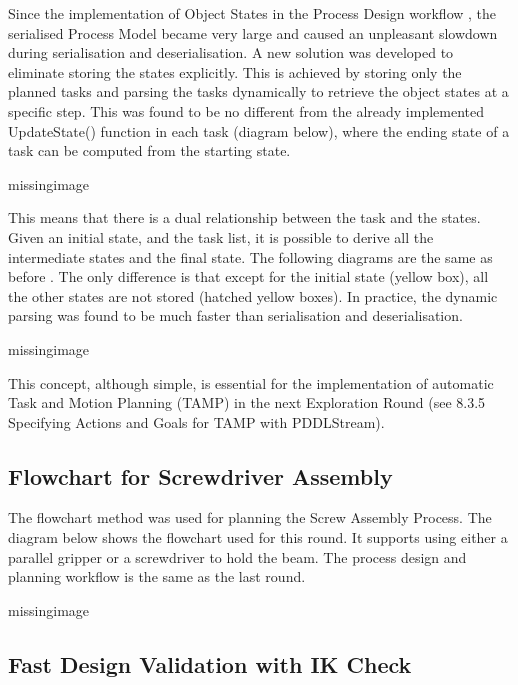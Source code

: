 Since the implementation of Object States in the Process Design workflow , the serialised Process Model became very large and caused an unpleasant slowdown during serialisation and deserialisation. A new solution was developed to eliminate storing the states explicitly. 
This is achieved by storing only the planned tasks and parsing the tasks dynamically to retrieve the object states at a specific step. This was found to be no different from the already implemented UpdateState() function in each task (diagram below), where the ending state of a task can be computed from the starting state. 

missingimage

This means that there is a dual relationship between the task and the states. Given an initial state, and the task list, it is possible to derive all the intermediate states and the final state. The following diagrams are the same as before . The only difference is that except for the initial state (yellow box), all the other states are not stored (hatched yellow boxes). In practice, the dynamic parsing was found to be much faster than serialisation and deserialisation.

missingimage

This concept, although simple, is essential for the implementation of automatic Task and Motion Planning (TAMP) in the next Exploration Round (see 8.3.5 Specifying Actions and Goals for TAMP with PDDLStream).

\subsection{Flowchart for Screwdriver Assembly}
\label{subsection:exploration_4_flowchart_for_screwdriver_assembly}

The flowchart method  was used for planning the Screw Assembly Process. The diagram below shows the flowchart used for this round. It supports using either a parallel gripper or a screwdriver to hold the beam. The process design and planning workflow is the same as the last round.

missingimage

\subsection{Fast Design Validation with IK Check}
\label{subsection:exploration_4_fast_design_validation_with_ik_check}

